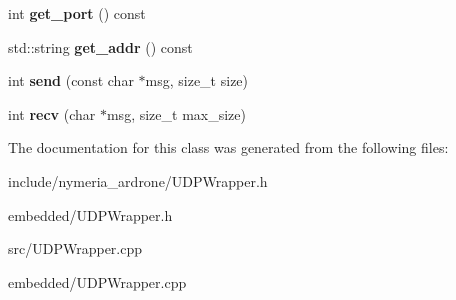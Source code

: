 \begin{DoxyCompactItemize}
\item 
\hypertarget{classUDPClient_a1704aa3773d5133d3dd27b4ab90d6ed7}{int {\bfseries get\-\_\-port} () const }\label{classUDPClient_a1704aa3773d5133d3dd27b4ab90d6ed7}

\item 
\hypertarget{classUDPClient_a9c447c882c46dcdd0ce449feea44fd5d}{std\-::string {\bfseries get\-\_\-addr} () const }\label{classUDPClient_a9c447c882c46dcdd0ce449feea44fd5d}

\item 
\hypertarget{classUDPClient_a1f1e12cba5f35d9436e64bc1784171f8}{int {\bfseries send} (const char $\ast$msg, size\-\_\-t size)}\label{classUDPClient_a1f1e12cba5f35d9436e64bc1784171f8}

\item 
\hypertarget{classUDPClient_a0d68aacc0fc4e1842885178c362e97d1}{int {\bfseries recv} (char $\ast$msg, size\-\_\-t max\-\_\-size)}\label{classUDPClient_a0d68aacc0fc4e1842885178c362e97d1}

\end{DoxyCompactItemize}


\-The documentation for this class was generated from the following files\-:\begin{DoxyCompactItemize}
\item 
include/nymeria\-\_\-ardrone/\-U\-D\-P\-Wrapper.\-h\item 
embedded/\-U\-D\-P\-Wrapper.\-h\item 
src/\-U\-D\-P\-Wrapper.\-cpp\item 
embedded/\-U\-D\-P\-Wrapper.\-cpp\end{DoxyCompactItemize}
